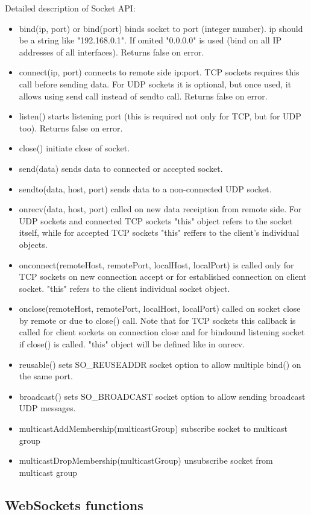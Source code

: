 Detailed description of Socket API:
\begin{itemize}
\item bind(ip, port) or bind(port) binds socket to port (integer number). ip should be a 
string like "192.168.0.1". If omited "0.0.0.0" is used (bind on all IP addresses of all 
interfaces). Returns false on error.
\item connect(ip, port) connects to remote side ip:port. TCP sockets requires this call 
before sending data. For UDP sockets it is optional, but once used, it allows using send call  instead of sendto call. Returns false on error.
\item listen() starts listening port (this is required not only for TCP, but for UDP too). 
Returns false on error.
\item close() initiate close of socket.
\item send(data) sends data to connected or accepted socket.
\item sendto(data, host, port) sends data to a non-connected UDP socket.
\item onrecv(data, host, port) called on new data receiption from remote side. For UDP 
sockets and connected TCP sockets "this" object refers to the socket itself, while for 
accepted TCP sockets "this" reffers to the client's individual objects.
\item onconnect(remoteHost, remotePort, localHost, localPort) is called only for TCP sockets 
on new connection accept or for established connection on client socket.
"this" refers to the client individual socket object.
\item onclose(remoteHost, remotePort, localHost, localPort) called on socket close by 
remote or due to close() call. Note that for TCP sockets this callback is called for client 
sockets on connection close and for bindound listening socket if close() is called. "this" 
object will be defined like in onrecv.
\item reusable() sets SO\_REUSEADDR socket option to allow multiple bind() on the same port.
\item broadcast() sets SO\_BROADCAST socket option to allow sending broadcast UDP messages.
\item multicastAddMembership(multicastGroup) subscribe socket to multicast group
\item multicastDropMembership(multicastGroup) unsubscribe socket from multicast group
\end{itemize}

\subsection{WebSockets functions}

